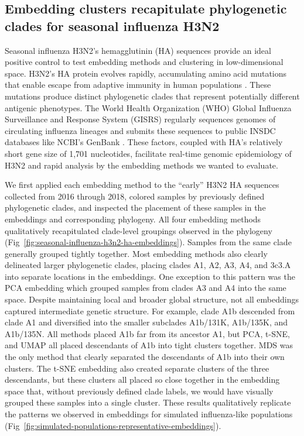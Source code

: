 \documentclass[10pt,letterpaper]{article}
\begin{document}
\subsection*{Embedding clusters recapitulate phylogenetic clades for seasonal influenza H3N2}

Seasonal influenza H3N2's hemagglutinin (HA) sequences provide an ideal positive control to test embedding methods and clustering in low-dimensional space.
H3N2's HA protein evolves rapidly, accumulating amino acid mutations that enable escape from adaptive immunity in human populations \cite{Petrova2018}.
These mutations produce distinct phylogenetic clades that represent potentially different antigenic phenotypes.
The World Health Organization (WHO) Global Influenza Surveillance and Response System (GISRS) regularly sequences genomes of circulating influenza lineages \cite{Hay2018} and submits these sequences to public INSDC databases like NCBI's GenBank \cite{Arita2021}.
These factors, coupled with HA's relatively short gene size of 1,701 nucleotides, facilitate real-time genomic epidemiology of H3N2 \cite{Neher2015} and rapid analysis by the embedding methods we wanted to evaluate.

We first applied each embedding method to the ``early'' H3N2 HA sequences collected from 2016 through 2018, colored samples by previously defined phylogenetic clades, and inspected the placement of these samples in the embeddings and corresponding phylogeny.
All four embedding methods qualitatively recapitulated clade-level groupings observed in the phylogeny (Fig~\ref{fig:seasonal-influenza-h3n2-ha-embeddings}).
Samples from the same clade generally grouped tightly together.
Most embedding methods also clearly delineated larger phylogenetic clades, placing clades A1, A2, A3, A4, and 3c3.A into separate locations in the embeddings.
One exception to this pattern was the PCA embedding which grouped samples from clades A3 and A4 into the same space.
Despite maintaining local and broader global structure, not all embeddings captured intermediate genetic structure.
For example, clade A1b descended from clade A1 and diversified into the smaller subclades A1b/131K, A1b/135K, and A1b/135N.
All methods placed A1b far from its ancestor A1, but PCA, t-SNE, and UMAP all placed descendants of A1b into tight clusters together.
MDS was the only method that clearly separated the descendants of A1b into their own clusters.
The t-SNE embedding also created separate clusters of the three descendants, but these clusters all placed so close together in the embedding space that, without previously defined clade labels, we would have visually grouped these samples into a single cluster.
These results qualitatively replicate the patterns we observed in embeddings for simulated influenza-like populations (Fig~\ref{fig:simulated-populations-representative-embeddings}).
\end{document}
